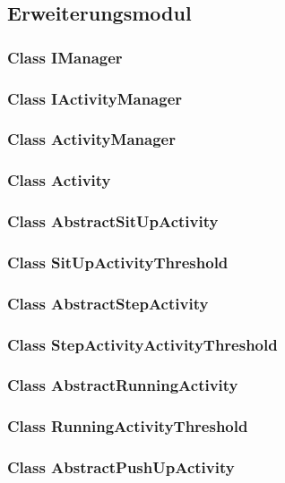 \documentclass[a4paper,12pt]{article}
\begin{document}
\subsection{Erweiterungsmodul}
	\subsubsection{Class IManager}
	
	\subsubsection{Class IActivityManager}
	\subsubsection{Class ActivityManager}
	
	\subsubsection{Class Activity}
	
	\subsubsection{Class AbstractSitUpActivity}
	\subsubsection{Class SitUpActivityThreshold}
	
	\subsubsection{Class AbstractStepActivity}
	\subsubsection{Class StepActivityActivityThreshold}
	
	\subsubsection{Class AbstractRunningActivity}
	\subsubsection{Class RunningActivityThreshold}
	
	\subsubsection{Class AbstractPushUpActivity}
\end{document}
